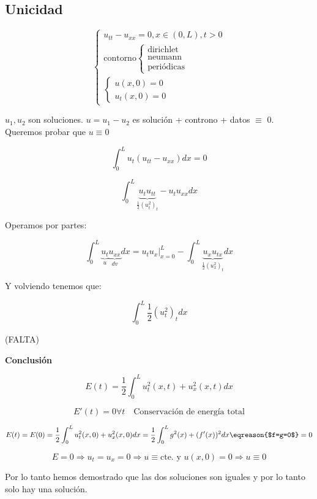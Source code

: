 	\subsection{Unicidad}

		\[\begin{cases}
		   u_{tt}-u_{xx} = 0, x \in (0,L), t >0\\
		   \text{contorno} \begin{cases}
		   	\text{dirichlet}\\
		   	\text{neumann}\\
		   	\text{periódicas}
		   \end{cases}\\
		   \begin{cases}
		   u(x,0) = 0 \\
		   u_t (x,0) = 0
		   \end{cases}
		\end{cases}
		 \]


		 $u_1, u_{2}$ son soluciones. $u = u_1 - u_2$ es solución + controno + datos $\equiv$ 0. Queremos probar que $u\equiv0$


		 \[ \int_{0}^{L} u_t (u_{tt}- u_{xx}) dx = 0 \]

		 \[ \int_0^L \underbrace{u_t u_{tt}}_{\frac{1}{2}(u^2_t)_t} - u_t u_{xx} dx  \]

		 Operamos por partes:

		 \[ \int_0^L  \underbrace{u_t}_{u} \underbrace{u_{xx}}_{dv}  dx = \left. u_t u_x \right|_{x=0}^{L} - \int_0^L \underbrace{u_x u_{tx}}_{\frac{1}{2}(u_x^2)_t} dx \]

		 Y volviendo tenemos que:

		 \[  \int^{L}_{0} \frac{1}{2} (u_t^2)_t dx  \]

		 (FALTA)


		 \textbf{Conclusión}

		 \[ E(t) = \frac{1}{2} \int_{0}^L u_t^2(x,t) + u_x^2(x,t) dx \]

		 \[ E'(t) = 0 \forall t \quad \text{Conservación de energía total}\]


		 \[ E(t) = E(0) = \frac{1}{2} \int_0^L u_t^2 (x,0) + u_x^2 (x,0) dx = \frac{1}{2} \int_0^L g^2(x)+(f'(x))^2 dx \eqreason{$f=g=0$} = 0 \]

		 \[ E=0 \Rightarrow u_t = u_x = 0 \Rightarrow u \equiv \text{cte. y } u(x,0) = 0 \Rightarrow u \equiv 0\]

		 Por lo tanto hemos demostrado que las dos soluciones son iguales y por lo tanto solo hay una solución.

